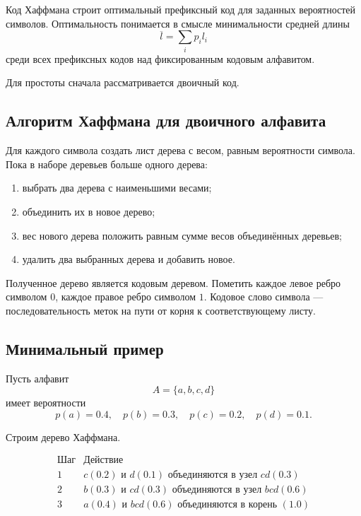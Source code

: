 \documentclass[12pt,a4paper]{article}
\begin{document}
Код Хаффмана строит оптимальный префиксный код для заданных вероятностей символов.
Оптимальность понимается в смысле минимальности средней длины
\[
    \overline l=\sum_i p_i l_i
\]
среди всех префиксных кодов над фиксированным кодовым алфавитом.

Для простоты сначала рассматривается двоичный код.

\subsection{Алгоритм Хаффмана для двоичного алфавита}

\begin{algorithm}[H]
\caption{Построение двоичного кода Хаффмана}
\begin{algorithmic}[1]
\STATE Для каждого символа создать лист дерева с весом, равным вероятности символа.
\STATE Пока в наборе деревьев больше одного дерева:
\begin{enumerate}
    \item выбрать два дерева с наименьшими весами;
    \item объединить их в новое дерево;
    \item вес нового дерева положить равным сумме весов объединённых деревьев;
    \item удалить два выбранных дерева и добавить новое.
\end{enumerate}
\STATE Полученное дерево является кодовым деревом.
\STATE Пометить каждое левое ребро символом $0$, каждое правое ребро символом $1$.
\STATE Кодовое слово символа --- последовательность меток на пути от корня к соответствующему листу.
\end{algorithmic}
\end{algorithm}

\subsection{Минимальный пример}

Пусть алфавит
\[
    A=\{a,b,c,d\}
\]
имеет вероятности
\[
    p(a)=0.4,\quad p(b)=0.3,\quad p(c)=0.2,\quad p(d)=0.1.
\]

Строим дерево Хаффмана.

\[
\begin{array}{c|c}
\text{Шаг} & \text{Действие}\\
\hline
1 & c(0.2) \text{ и } d(0.1) \text{ объединяются в узел } cd(0.3)\\
2 & b(0.3) \text{ и } cd(0.3) \text{ объединяются в узел } bcd(0.6)\\
3 & a(0.4) \text{ и } bcd(0.6) \text{ объединяются в корень }(1.0)
\end{array}
\]
\end{document}
